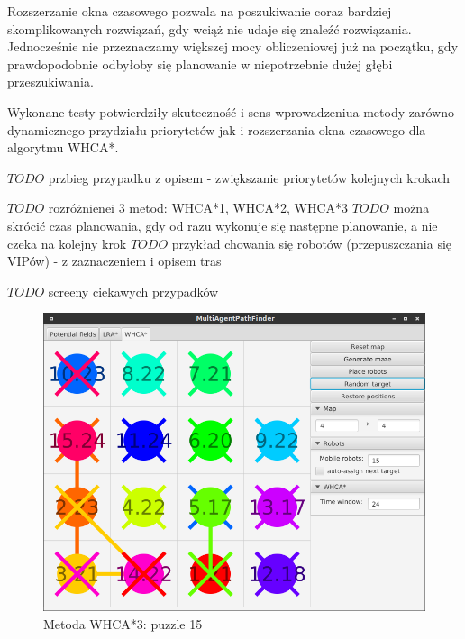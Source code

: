 Rozszerzanie okna czasowego pozwala na poszukiwanie coraz bardziej skomplikowanych rozwiązań, gdy wciąż nie udaje się znaleźć rozwiązania. Jednocześnie nie przeznaczamy większej mocy obliczeniowej już na początku, gdy prawdopodobnie odbyłoby się planowanie w niepotrzebnie dużej głębi przeszukiwania.

Wykonane testy potwierdziły skuteczność i sens wprowadzeniua metody zarówno dynamicznego przydziału priorytetów jak i rozszerzania okna czasowego dla algorytmu WHCA*.

$TODO$
przbieg przypadku z opisem - zwiększanie priorytetów kolejnych krokach

$TODO$ rozróżnienei 3 metod: WHCA*1, WHCA*2, WHCA*3
$TODO$ można skrócić czas planowania, gdy od razu wykonuje się następne planowanie, a nie czeka na kolejny krok
$TODO$ przykład chowania się robotów (przepuszczania się VIPów) - z zaznaczeniem i opisem tras


$TODO$ screeny ciekawych przypadków
\begin{figure}
	\centering
	\includegraphics[width=0.8\columnwidth]{img/robopath/puzzle-15}
	\caption{Metoda WHCA*3: puzzle 15}
	\label{fig:test-puzzle-15}
\end{figure}